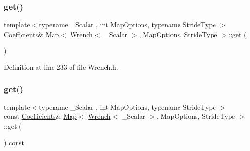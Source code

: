 \subsubsection{\texorpdfstring{get()}{get()}\hspace{0.1cm}{\footnotesize\ttfamily [1/2]}}
{\footnotesize\ttfamily template$<$typename \+\_\+\+Scalar , int Map\+Options, typename Stride\+Type $>$ \\
\hyperlink{class_map_3_01_wrench_3_01___scalar_01_4_00_01_map_options_00_01_stride_type_01_4_abfc1bf3f7dc1d3051325edad634172e8}{Coefficients}\& \hyperlink{class_map_3_01_wrench_3_01___scalar_01_4_00_01_map_options_00_01_stride_type_01_4_ab778c7158f5d29d76672346ecfe4e3ea}{Map}$<$ \hyperlink{class_wrench}{Wrench}$<$ \+\_\+\+Scalar $>$, Map\+Options, Stride\+Type $>$\+::get (\begin{DoxyParamCaption}{ }\end{DoxyParamCaption})\hspace{0.3cm}{\ttfamily [inline]}}



Definition at line 233 of file Wrench.\+h.

\hypertarget{class_map_3_01_wrench_3_01___scalar_01_4_00_01_map_options_00_01_stride_type_01_4_ab25730235675b6ac5e04b222931a5050}{}\label{class_map_3_01_wrench_3_01___scalar_01_4_00_01_map_options_00_01_stride_type_01_4_ab25730235675b6ac5e04b222931a5050} 
\subsubsection{\texorpdfstring{get()}{get()}\hspace{0.1cm}{\footnotesize\ttfamily [2/2]}}
{\footnotesize\ttfamily template$<$typename \+\_\+\+Scalar , int Map\+Options, typename Stride\+Type $>$ \\
const \hyperlink{class_map_3_01_wrench_3_01___scalar_01_4_00_01_map_options_00_01_stride_type_01_4_abfc1bf3f7dc1d3051325edad634172e8}{Coefficients}\& \hyperlink{class_map_3_01_wrench_3_01___scalar_01_4_00_01_map_options_00_01_stride_type_01_4_ab778c7158f5d29d76672346ecfe4e3ea}{Map}$<$ \hyperlink{class_wrench}{Wrench}$<$ \+\_\+\+Scalar $>$, Map\+Options, Stride\+Type $>$\+::get (\begin{DoxyParamCaption}{ }\end{DoxyParamCaption}) const\hspace{0.3cm}{\ttfamily [inline]}}



